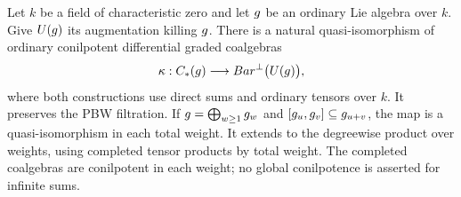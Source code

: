 \begin{theorem}
\label{thm:bar-chevalley-spine}
Let $k$ be a field of characteristic zero and let $g$ be an ordinary Lie algebra over $k$.
Give $U(g)$ its augmentation killing $g$.
There is a natural quasi-isomorphism of ordinary conilpotent differential graded coalgebras
\[
 \kappa:C_*(g)\longrightarrow Bar^{\perp}\bigl(U(g)\bigr),
\]
where both constructions use direct sums and ordinary tensors over $k$.
It preserves the PBW filtration.
If $g=\bigoplus_{w\ge1}g_w$ and $[g_u,g_v]\subseteq g_{u+v}$,
the map is a quasi-isomorphism in each total weight.
It extends to the degreewise product over weights, using completed tensor products by total weight.
The completed coalgebras are conilpotent in each weight; no global conilpotence is asserted for infinite sums.
\end{theorem}
